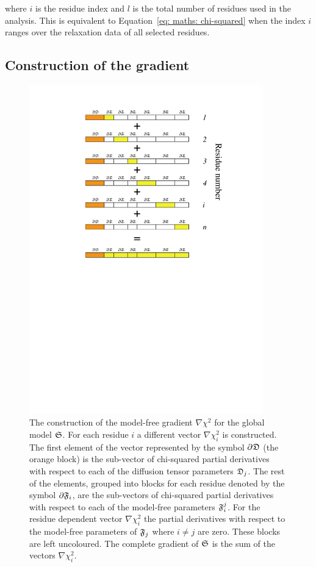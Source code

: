 \noindent where $i$ is the residue index and $l$ is the total number of residues used in the analysis.  This is equivalent to Equation~\eqref{eq: maths: chi-squared} when the index $i$ ranges over the relaxation data of all selected residues.




\subsection{Construction of the gradient}

\begin{figure}
\centerline{\includegraphics[width=0.9\textwidth, bb=143 399 494 777]{images/gradient}}
\caption[The construction of the model-free gradient.]{The construction of the model-free gradient $\nabla \chi^2$ for the global model $\mathfrak{S}$.  For each residue $i$ a different vector $\nabla \chi^2_i$ is constructed.  The first element of the vector represented by the symbol $\partial \mathfrak{D}$ (the orange block) is the sub-vector of chi-squared partial derivatives with respect to each of the diffusion tensor parameters $\mathfrak{D}_j$.  The rest of the elements, grouped into blocks for each residue denoted by the symbol $\partial \mathfrak{F}_i$, are the sub-vectors of chi-squared partial derivatives with respect to each of the model-free parameters $\mathfrak{F}_i^j$.  For the residue dependent vector $\nabla \chi^2_i$ the partial derivatives with respect to the model-free parameters of $\mathfrak{F}_j$ where $i \ne j$ are zero.  These blocks are left uncoloured.  The complete gradient of $\mathfrak{S}$ is the sum of the vectors $\nabla \chi^2_i$.}\label{fig: gradient construction}

\end{figure}
